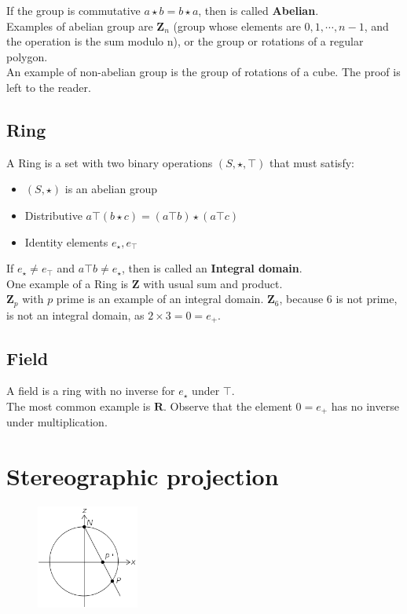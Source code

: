 \documentclass[12pt]{article}
\begin{document}
	If the group is commutative $a\star b= b\star a$, then is called \textbf{Abelian}. \\
	
	Examples of abelian group are $\mathbf{Z}_n$ (group whose elements are $0, 1, \cdots, n-1$, and the operation is the sum modulo n), or the group or rotations of a regular polygon. \\
	
	An example of non-abelian group is the group of rotations of a cube. The proof is left to the reader.
	
	\subsection{Ring}
	A Ring is a set with two binary operations $(S,\star, \top)$ that must satisfy:
	\begin{itemize}
		\item $(S, \star)$ is an abelian group
		\item Distributive $a\top (b\star c)= (a\top b) \star (a\top c)$
		\item Identity elements $e_\star, e_\top$
	\end{itemize}
	
	If $e_\star \neq e_\top$ and $a\top b\neq e_\star$, then is called an \textbf{Integral domain}.\\
	
	One example of a Ring is $\mathbf{Z}$ with usual sum and product.\\
	
	$\mathbf{Z}_p$ with $p$ prime is an example of an integral domain. $\mathbf{Z}_6$, because 6 is not prime, is not an integral domain, as $2\times 3=0=e_+$. 
	
	\subsection{Field}
	A field is a ring with no inverse for $e_\star$ under $\top$.\\
	
	The most common example is $\mathbf{R}$. Observe that the element $0=e_+$ has no inverse under multiplication.
	
\section{Stereographic projection}
    \begin{figure}
        \centering
        \includegraphics[width=0.30\textwidth]{stereo1}
    \end{figure}
    
\end{document}
